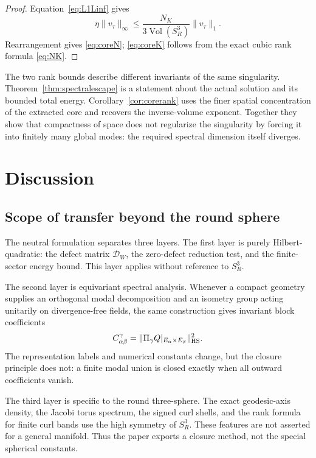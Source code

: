 \documentclass[aps,prd,reprint,superscriptaddress,nofootinbib,floatfix]{revtex4-2}
\theoremstyle{definition}
\theoremstyle{remark}
\newcommand{\Vol}{\operatorname{Vol}}
\begin{document}
\begin{proof}
	Equation~\eqref{eq:L1Linf} gives
	\begin{equation}
		\eta\|v_\tau\|_\infty
		\le
		\frac{N_K}{3\Vol(S^3_R)}\|v_\tau\|_1.
	\end{equation}
	Rearrangement gives \eqref{eq:coreN}; \eqref{eq:coreK} follows from the exact cubic rank formula \eqref{eq:NK}.
\end{proof}

The two rank bounds describe different invariants of the same singularity.  Theorem~\ref{thm:spectralescape} is a statement about the actual solution and its bounded total energy.  Corollary~\ref{cor:corerank} uses the finer spatial concentration of the extracted core and recovers the inverse-volume exponent.  Together they show that compactness of space does not regularize the singularity by forcing it into finitely many global modes: the required spectral dimension itself diverges.

\section{Discussion}

\subsection{Scope of transfer beyond the round sphere}

The neutral formulation separates three layers.  The first layer is purely Hilbert-quadratic: the defect matrix \(\mathcal D_W\), the zero-defect reduction test, and the finite-sector energy bound.  This layer applies without reference to \(S^3_R\).

The second layer is equivariant spectral analysis.  Whenever a compact geometry supplies an orthogonal modal decomposition and an isometry group acting unitarily on divergence-free fields, the same construction gives invariant block coefficients
\[
	C_{\alpha\beta}^{\gamma}
	=
	\|\Pi_\gamma Q|_{E_\alpha\times E_\beta}\|_{\rm HS}^2.
\]
The representation labels and numerical constants change, but the closure principle does not: a finite modal union is closed exactly when all outward coefficients vanish.

The third layer is specific to the round three-sphere.  The exact geodesic-axis density, the Jacobi torus spectrum, the signed curl shells, and the rank formula for finite curl bands use the high symmetry of \(S^3_R\).  These features are not asserted for a general manifold.  Thus the paper exports a closure method, not the special spherical constants.
\end{document}
